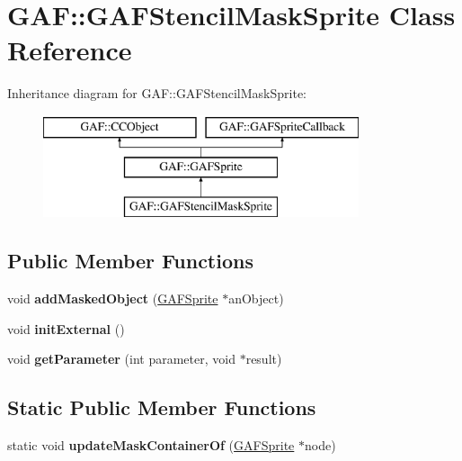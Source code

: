 \hypertarget{class_g_a_f_1_1_g_a_f_stencil_mask_sprite}{\section{G\-A\-F\-:\-:G\-A\-F\-Stencil\-Mask\-Sprite Class Reference}
\label{class_g_a_f_1_1_g_a_f_stencil_mask_sprite}
}
Inheritance diagram for G\-A\-F\-:\-:G\-A\-F\-Stencil\-Mask\-Sprite\-:\begin{figure}[H]
\begin{center}
\leavevmode
\includegraphics[height=3.000000cm]{class_g_a_f_1_1_g_a_f_stencil_mask_sprite}
\end{center}
\end{figure}
\subsection*{Public Member Functions}
\begin{DoxyCompactItemize}
\item 
\hypertarget{class_g_a_f_1_1_g_a_f_stencil_mask_sprite_a7d3ece82011b77f045c95632592b746b}{void {\bfseries add\-Masked\-Object} (\hyperlink{class_g_a_f_1_1_g_a_f_sprite}{G\-A\-F\-Sprite} $\ast$an\-Object)}\label{class_g_a_f_1_1_g_a_f_stencil_mask_sprite_a7d3ece82011b77f045c95632592b746b}

\item 
\hypertarget{class_g_a_f_1_1_g_a_f_stencil_mask_sprite_a8c6dbf171d1e6b28da266197521d03dd}{void {\bfseries init\-External} ()}\label{class_g_a_f_1_1_g_a_f_stencil_mask_sprite_a8c6dbf171d1e6b28da266197521d03dd}

\item 
\hypertarget{class_g_a_f_1_1_g_a_f_stencil_mask_sprite_afd982bb4bbf76c85f195af1d2d9fb83c}{void {\bfseries get\-Parameter} (int parameter, void $\ast$result)}\label{class_g_a_f_1_1_g_a_f_stencil_mask_sprite_afd982bb4bbf76c85f195af1d2d9fb83c}

\end{DoxyCompactItemize}
\subsection*{Static Public Member Functions}
\begin{DoxyCompactItemize}
\item 
\hypertarget{class_g_a_f_1_1_g_a_f_stencil_mask_sprite_a758c3751f5e9d5bc8be38d670d2199df}{static void {\bfseries update\-Mask\-Container\-Of} (\hyperlink{class_g_a_f_1_1_g_a_f_sprite}{G\-A\-F\-Sprite} $\ast$node)}\label{class_g_a_f_1_1_g_a_f_stencil_mask_sprite_a758c3751f5e9d5bc8be38d670d2199df}

\end{DoxyCompactItemize}
